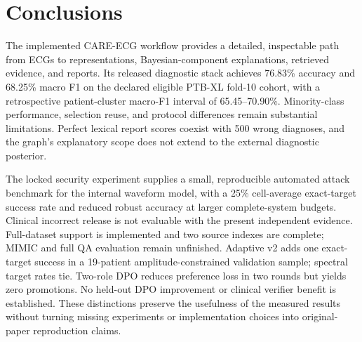 \section{Conclusions}
The implemented CARE-ECG workflow provides a detailed, inspectable path from ECGs to representations, Bayesian-component explanations, retrieved evidence, and reports. Its released diagnostic stack achieves 76.83\% accuracy and 68.25\% macro F1 on the declared eligible PTB-XL fold-10 cohort, with a retrospective patient-cluster macro-F1 interval of 65.45--70.90\%. Minority-class performance, selection reuse, and protocol differences remain substantial limitations. Perfect lexical report scores coexist with 500 wrong diagnoses, and the graph's explanatory scope does not extend to the external diagnostic posterior.

The locked security experiment supplies a small, reproducible automated attack benchmark for the internal waveform model, with a 25\% cell-average exact-target success rate and reduced robust accuracy at larger complete-system budgets. Clinical incorrect release is not evaluable with the present independent evidence. Full-dataset support is implemented and two source indexes are complete; MIMIC and full QA evaluation remain unfinished. Adaptive v2 adds one exact-target success in a 19-patient amplitude-constrained validation sample; spectral target rates tie. Two-role DPO reduces preference loss in two rounds but yields zero promotions. No held-out DPO improvement or clinical verifier benefit is established. These distinctions preserve the usefulness of the measured results without turning missing experiments or implementation choices into original-paper reproduction claims.

\clearpage
